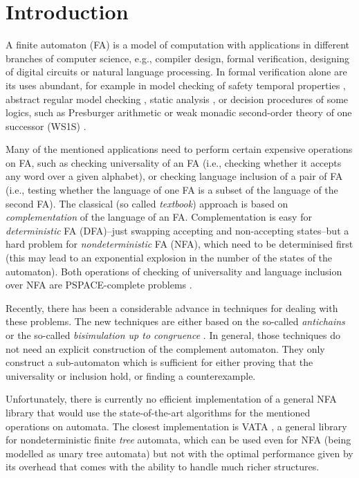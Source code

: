 \chapter{Introduction}
\label{introduction}
A finite automaton (FA) is a model of computation with applications in different branches of computer science, e.g., compiler design, formal verification, 
designing of digital circuits or natural language processing. In formal verification alone are its uses abundant, 
for example in model checking of safety temporal properties \cite{principles}, abstract regular model checking \cite{armc}, static analysis \cite{metal}, 
or decision procedures of some logics, such as Presburger arithmetic or weak 
monadic second-order theory of one successor (WS1S) \cite{mona}.

Many of the mentioned applications need to perform certain expensive operations on FA, such as checking universality of an FA (i.e., checking whether it
accepts any word over a given alphabet), or checking language inclusion of a pair of FA (i.e., testing whether the language of one FA is a subset of the language
of the second FA). The classical (so called \emph{textbook}) approach is based on \emph{complementation} of the language of an FA. Complementation is easy for 
\emph{deterministic} FA (DFA)--just swapping accepting and non-accepting states--but a hard problem for \emph{nondeterministic} FA (NFA), which need 
to be determinised first (this may lead to an exponential explosion in the number of the states of the automaton). 
Both operations of checking of universality and language inclusion over NFA are PSPACE-complete problems \cite{cav06}.

Recently, there has been a considerable advance in techniques for dealing with these problems. The new techniques are either based on the so-called 
\emph{antichains} \cite{cav06,tacas10} or the so-called \emph{bisimulation up to congruence} \cite{popl13}. 
In general, those techniques do not need an explicit construction of the complement
automaton. They only construct a sub-automaton which is sufficient for either proving that the universality or inclusion hold, or finding a counterexample.

Unfortunately, there is currently no efficient implementation of a general NFA library that would use the state-of-the-art algorithms for the mentioned
operations on automata. The
closest implementation is VATA \cite{libvata}, a general library for nondeterministic finite \emph{tree} automata, which can be used even for NFA (being modelled 
as unary tree automata) but not with the optimal performance given by its overhead that comes with the ability to handle much richer structures. 
 
